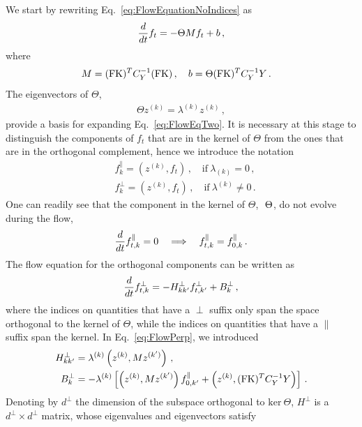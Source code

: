 \documentclass[11pt]{article}
\begin{document}
We start by rewriting Eq.~\eqref{eq:FlowEquationNoIndices} as
\begin{align}
    \label{eq:FlowEqTwo}
    \frac{d}{dt} f_t = -\Theta M f_t + b\, ,
\end{align}
where 
\begin{align}
    M &= (\mathrm{FK})^T C_Y^{-1} (\mathrm{FK})\, , \quad b = \Theta (\mathrm{FK})^T C_Y^{-1} Y\, .
\end{align}
The eigenvectors of $\Theta$, 
\begin{align}
    \label{eq:ThetaEigensystem}
    \Theta z^{(k)} = \lambda^{(k)} z^{(k)}\, ,
\end{align}
provide a basis for expanding Eq.~\eqref{eq:FlowEqTwo}. It is necessary at this stage to distinguish
the components of $f_t$ that are in the kernel of $\Theta$ from the ones that are in the orthogonal 
complement, hence we introduce the notation
\begin{align}
    &f^\parallel_{k} = \left(z^{(k)}, f_t\right)\, , \quad \text{if}\ \lambda_{(k)} = 0\, , \\
    &f^\perp_{k} = \left(z^{(k)}, f_t\right)\, , \quad \text{if}\ \lambda^{(k)} \neq 0\, .
\end{align}
One can readily see that the component in the kernel of $\Theta$, $\text\ \Theta$, 
do not evolve during the flow, 
\begin{align}
    \label{eq:FlowParallel}
    \frac{d}{dt} f^\parallel_{t,k} = 0 
        \quad \Longrightarrow \quad f^\parallel_{t,k} = f^\parallel_{0,k}\, .
\end{align}
The flow equation for the orthogonal components can be written as
\begin{align}
    \label{eq:FlowPerp}
    \frac{d}{dt} f^\perp_{t,k} = - H^\perp_{kk'} f^\perp_{t,k'} + B^\perp_{k}\, ,    
\end{align}
where the indices on quantities that have a $\perp$ suffix only span the space orthogonal to the kernel 
of $\Theta$, while the indices on quantities that have a $\parallel$ suffix span the kernel. 
In Eq.~\eqref{eq:FlowPerp}, we introduced
\begin{align}
    H^\perp_{kk'} &= \lambda^{(k)} \left(z^{(k)}, M z^{(k')}\right)\, ,\\
    B^\perp_k &= -\lambda^{(k)} \left[\left(z^{(k)}, M z^{(k')}\right) f^\parallel_{0,k'} 
        + \left(z^{(k)}, (\mathrm{FK})^T C_Y^{-1} Y\right)\right]\, .
\end{align}
Denoting by $d^\perp$ the dimension of the subspace orthogonal to $\text{ker}\ \Theta$, $H^\perp$ is 
a $d^\perp\times d^\perp$ matrix, whose eigenvalues and eigenvectors satisfy
\end{document}

